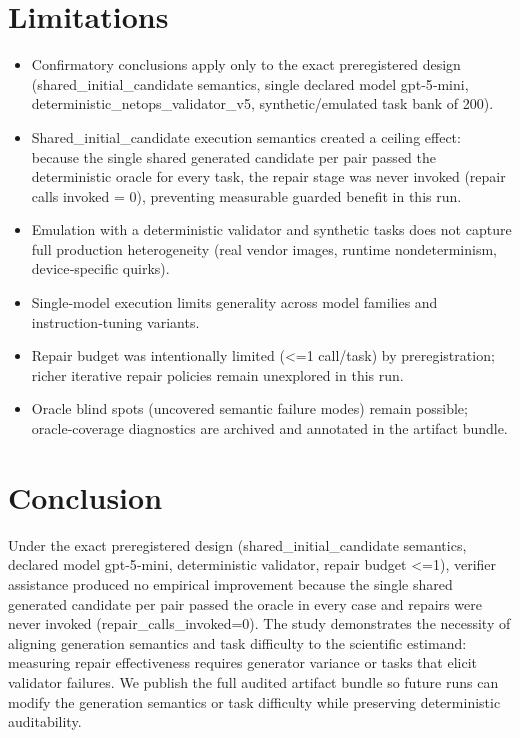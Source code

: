 \documentclass[conference]{IEEEtran}
\begin{document}
\section{Limitations}
\begin{itemize}
\item Confirmatory conclusions apply only to the exact preregistered design (shared\_initial\_candidate semantics, single declared model gpt‑5‑mini, deterministic\_netops\_validator\_v5, synthetic/emulated task bank of 200).
\item Shared\_initial\_candidate execution semantics created a ceiling effect: because the single shared generated candidate per pair passed the deterministic oracle for every task, the repair stage was never invoked (repair calls invoked = 0), preventing measurable guarded benefit in this run.
\item Emulation with a deterministic validator and synthetic tasks does not capture full production heterogeneity (real vendor images, runtime nondeterminism, device‑specific quirks).
\item Single‑model execution limits generality across model families and instruction‑tuning variants.
\item Repair budget was intentionally limited (<=1 call/task) by preregistration; richer iterative repair policies remain unexplored in this run.
\item Oracle blind spots (uncovered semantic failure modes) remain possible; oracle‑coverage diagnostics are archived and annotated in the artifact bundle.
\end{itemize}

\section{Conclusion}
Under the exact preregistered design (shared\_initial\_candidate semantics, declared model gpt‑5‑mini, deterministic validator, repair budget <=1), verifier assistance produced no empirical improvement because the single shared generated candidate per pair passed the oracle in every case and repairs were never invoked (repair\_calls\_invoked=0). The study demonstrates the necessity of aligning generation semantics and task difficulty to the scientific estimand: measuring repair effectiveness requires generator variance or tasks that elicit validator failures. We publish the full audited artifact bundle so future runs can modify the generation semantics or task difficulty while preserving deterministic auditability.
\end{document}
